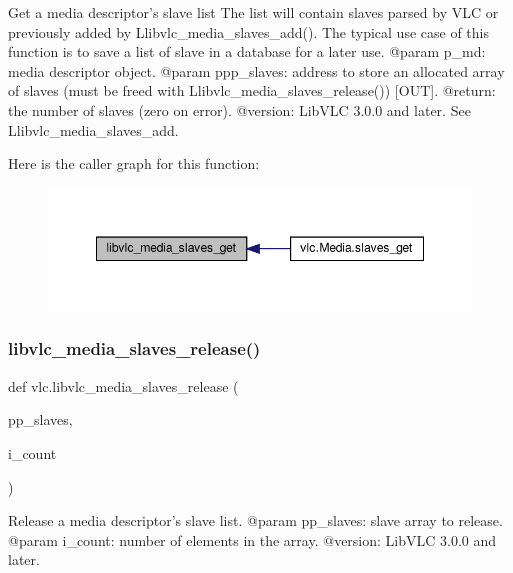 \begin{DoxyVerb}Get a media descriptor's slave list
The list will contain slaves parsed by VLC or previously added by
L{libvlc_media_slaves_add}(). The typical use case of this function is to save
a list of slave in a database for a later use.
@param p_md: media descriptor object.
@param ppp_slaves: address to store an allocated array of slaves (must be freed with L{libvlc_media_slaves_release}()) [OUT].
@return: the number of slaves (zero on error).
@version: LibVLC 3.0.0 and later. See L{libvlc_media_slaves_add}.
\end{DoxyVerb}
 Here is the caller graph for this function\+:
\nopagebreak
\begin{figure}[H]
\begin{center}
\leavevmode
\includegraphics[width=348pt]{namespacevlc_a8e0842606e258c50d03baa1ecae992b3_icgraph}
\end{center}
\end{figure}
\mbox{\label{namespacevlc_a0f88998fe6f9a81c6d9d4476acfd9b36}} 
\subsubsection{\texorpdfstring{libvlc\+\_\+media\+\_\+slaves\+\_\+release()}{libvlc\_media\_slaves\_release()}}
{\footnotesize\ttfamily def vlc.\+libvlc\+\_\+media\+\_\+slaves\+\_\+release (\begin{DoxyParamCaption}\item[{}]{pp\+\_\+slaves,  }\item[{}]{i\+\_\+count }\end{DoxyParamCaption})}

\begin{DoxyVerb}Release a media descriptor's slave list.
@param pp_slaves: slave array to release.
@param i_count: number of elements in the array.
@version: LibVLC 3.0.0 and later.
\end{DoxyVerb}
 \mbox{\label{namespacevlc_a344d49b0fc84dc1cfa63ab5d03872d5f}} 

